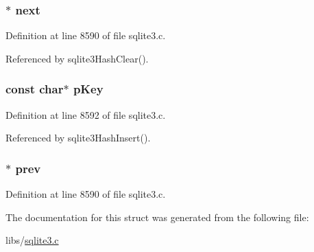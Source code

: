 \hypertarget{struct_hash_elem_a27ea4f910e02e974f759fe2080cd768b}{}
\subsubsection[{next}]{$\ast$ next}\label{struct_hash_elem_a27ea4f910e02e974f759fe2080cd768b}


Definition at line 8590 of file sqlite3.\+c.



Referenced by sqlite3\+Hash\+Clear().

\hypertarget{struct_hash_elem_a9321d7fedcf35ceb8cfcded1209d13bf}{}
\subsubsection[{p\+Key}]{\setlength{\rightskip}{0pt plus 5cm}const char$\ast$ p\+Key}\label{struct_hash_elem_a9321d7fedcf35ceb8cfcded1209d13bf}


Definition at line 8592 of file sqlite3.\+c.



Referenced by sqlite3\+Hash\+Insert().

\hypertarget{struct_hash_elem_aa233704aa1bbe094268fdedf929e8e52}{}
\subsubsection[{prev}]{ $\ast$ prev}\label{struct_hash_elem_aa233704aa1bbe094268fdedf929e8e52}


Definition at line 8590 of file sqlite3.\+c.



The documentation for this struct was generated from the following file\+:\begin{DoxyCompactItemize}
\item 
libs/\hyperlink{sqlite3_8c}{sqlite3.\+c}\end{DoxyCompactItemize}
